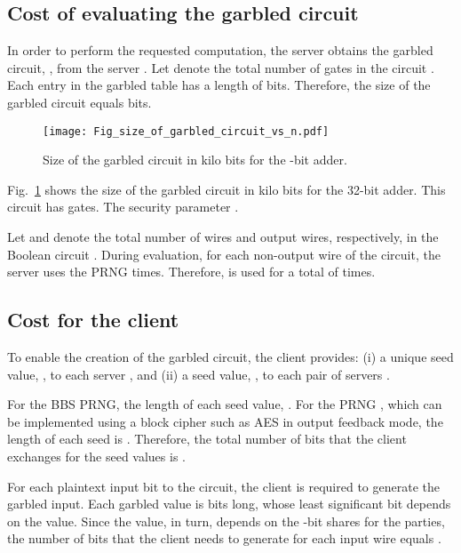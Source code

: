 \documentclass[10pt,journal,cspaper,compsoc]{IEEEtran}
\begin{document}
\subsection{Cost of evaluating the garbled circuit}

In order to perform the requested computation, the server  obtains the garbled circuit, , from the server . Let  denote the total number of gates in the circuit . Each entry in the garbled table has a length of  bits. Therefore, the size of the garbled circuit equals  bits.


\begin{figure}[t]
\centering
\texttt{[image: Fig\_size\_of\_garbled\_circuit\_vs\_n.pdf]}
\vspace{-3 mm}
\caption{Size of the garbled circuit in kilo bits for the -bit adder.\vspace{-3 mm}}
\label{fig_size_of_garbled_circuit}
\end{figure}


Fig.~\ref{fig_size_of_garbled_circuit} shows the size of the garbled circuit in kilo bits for the 32-bit adder. This circuit has  gates. The security parameter .


Let  and  denote the total number of wires and output wires, respectively, in the Boolean circuit . During evaluation, for each non-output wire of the circuit, the server  uses the PRNG   times. Therefore,  is used for a total of  times.


\subsection{Cost for the client}
\label{sec_cost_for_client}
To enable the creation of the garbled circuit, the client provides: (i) a unique seed value, , to each server , and (ii) a seed value, , to each pair of servers .


For the BBS PRNG, the length of each seed value, . For the PRNG , which can be implemented using a block cipher such as AES in output feedback mode, the length of each seed is . Therefore, the total number of bits that the client exchanges for the seed values is .



For each plaintext input bit to the circuit, the client is required to generate the garbled input. Each garbled value is  bits long, whose least significant bit depends on the  value. Since the  value, in turn, depends on the -bit shares for the  parties, the number of bits that the client needs to generate for each input wire equals .
\end{document}
